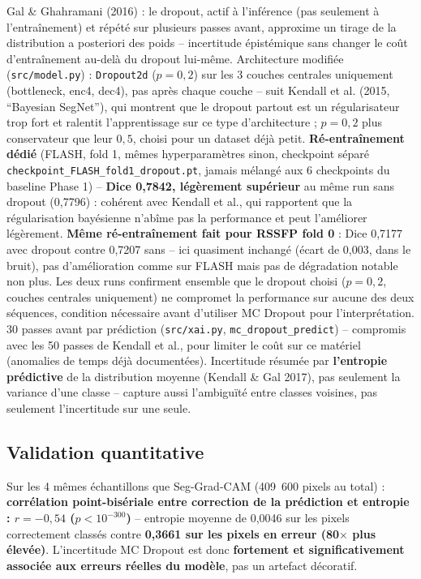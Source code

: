 \documentclass[11pt,a4paper]{report}
\begin{document}
Gal \& Ghahramani (2016) : le dropout, actif à l'inférence (pas seulement à
l'entraînement) et répété sur plusieurs passes avant, approxime un tirage de la
distribution a posteriori des poids -- incertitude épistémique sans changer le coût
d'entraînement au-delà du dropout lui-même. Architecture modifiée
(\texttt{src/model.py}) : \texttt{Dropout2d} ($p=0{,}2$) sur les 3 couches centrales
uniquement (bottleneck, enc4, dec4), pas après chaque couche -- suit Kendall et al.
(2015, ``Bayesian SegNet''), qui montrent que le dropout partout est un
régularisateur trop fort et ralentit l'apprentissage sur ce type d'architecture ;
$p=0{,}2$ plus conservateur que leur $0{,}5$, choisi pour un dataset déjà petit.
\textbf{Ré-entraînement dédié} (FLASH, fold 1, mêmes hyperparamètres sinon,
checkpoint séparé \texttt{checkpoint\_FLASH\_fold1\_dropout.pt}, jamais mélangé aux
6 checkpoints du baseline Phase 1) -- \textbf{Dice 0,7842, légèrement supérieur} au
même run sans dropout (0,7796) : cohérent avec Kendall et al., qui rapportent que la
régularisation bayésienne n'abîme pas la performance et peut l'améliorer légèrement.
\textbf{Même ré-entraînement fait pour RSSFP fold 0} : Dice 0,7177 avec dropout
contre 0,7207 sans -- ici quasiment inchangé (écart de 0,003, dans le bruit), pas
d'amélioration comme sur FLASH mais pas de dégradation notable non plus. Les deux
runs confirment ensemble que le dropout choisi ($p=0{,}2$, couches centrales
uniquement) ne compromet la performance sur aucune des deux séquences, condition
nécessaire avant d'utiliser MC Dropout pour l'interprétation.
30 passes avant par prédiction (\texttt{src/xai.py}, \texttt{mc\_dropout\_predict})
-- compromis avec les 50 passes de Kendall et al., pour limiter le coût sur ce
matériel (anomalies de temps déjà documentées). Incertitude résumée par
\textbf{l'entropie prédictive} de la distribution moyenne (Kendall \& Gal 2017), pas
seulement la variance d'une classe -- capture aussi l'ambiguïté entre classes
voisines, pas seulement l'incertitude sur une seule.

\subsection{Validation quantitative}

Sur les 4 mêmes échantillons que Seg-Grad-CAM (409~600 pixels au total) :
\textbf{corrélation point-bisériale entre correction de la prédiction et entropie :
$r=-0{,}54$ ($p<10^{-300}$)} -- entropie moyenne de 0,0046 sur les pixels
correctement classés contre \textbf{0,3661 sur les pixels en erreur (80$\times$
plus élevée)}. L'incertitude MC Dropout est donc \textbf{fortement et
significativement associée aux erreurs réelles du modèle}, pas un artefact
décoratif.
\end{document}
